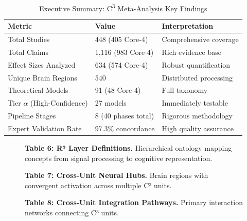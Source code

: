 \documentclass[9pt,onecolumn]{article}
\begin{document}
\vspace{0.5em}

\begin{table}[H]
\centering
\caption{Executive Summary: C\textsuperscript{3} Meta-Analysis Key Findings}
\label{tab:executive}
\small
\begin{tabular}{@{}lp{5.5cm}l@{}}
\toprule
\textbf{Metric} & \textbf{Value} & \textbf{Interpretation} \\
\midrule
Total Studies & 448 (405 Core-4) & Comprehensive coverage \\
Total Claims & 1,116 (983 Core-4) & Rich evidence base \\
Effect Sizes Analyzed & 634 (574 Core-4) & Robust quantification \\
Unique Brain Regions & 540 & Distributed processing \\
Theoretical Models & 91 (48 Core-4) & Full taxonomy \\
Tier $\alpha$ (High-Confidence) & 27 models & Immediately testable \\
Pipeline Stages & 8 (40 phases total) & Rigorous methodology \\
Expert Validation Rate & 97.3\% concordance & High quality assurance \\
\bottomrule
\end{tabular}
\end{table}

\clearpage
\twocolumn

\begin{figure}[H]
\centering
\vspace{0.3em}
{\fontsize{7}{8.4}\selectfont\textbf{Table 6: R³ Layer Definitions.} Hierarchical ontology mapping concepts from signal processing to cognitive representation.}
\label{tab:r3-layers}
\end{figure}

\begin{figure}[H]
\centering
\vspace{0.3em}
{\fontsize{7}{8.4}\selectfont\textbf{Table 7: Cross-Unit Neural Hubs.} Brain regions with convergent activation across multiple C³ units.}
\label{tab:neural-hubs}
\end{figure}

\begin{figure}[H]
\centering
\vspace{0.3em}
{\fontsize{7}{8.4}\selectfont\textbf{Table 8: Cross-Unit Integration Pathways.} Primary interaction networks connecting C³ units.}
\label{tab:integration-pathways}
\end{figure}
\end{document}
